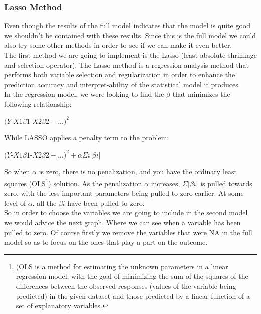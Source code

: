 \documentclass{book}
\begin{document}
\subsubsection{Lasso Method}
Even though the results of the full model indicates that the model is quite good we shouldn't be contained with these results. Since this is the full model we could also try some other methods in order to see if we can make it even better.\\
The first method we are going to implement is the Lasso (least absolute shrinkage and selection operator). The Lasso method is a regression analysis method that performs both variable selection and regularization in order to enhance the prediction accuracy and interpret-ability of the statistical model it produces.\\
In the regression model, we were looking to find the $β$ that minimizes the following relationship:
\begin{center}
$(Y${-}$X1\beta 1${-}$X2\beta 2−...)^{2}$
\end{center}
While LASSO applies a penalty term to the problem:
\begin{center}
$(Y${-}$X1\beta 1${-}$X2\beta 2−...)^{2}+\alpha\Sigma i|\beta i|$
\end{center}
So when $\alpha$ is zero, there is no penalization, and you have the ordinary least squares (OLS\footnote{(OLS is a method for estimating the unknown parameters in a linear regression model, with the goal of minimizing the sum of the squares of the differences between the observed responses (values of the variable being predicted) in the given dataset and those predicted by a linear function of a set of explanatory variables.}) solution. As the penalization $\alpha$ increases, $\Sigma|\beta i|$ is pulled towards zero, with the less important parameters being pulled to zero earlier. At some level of $\alpha$, all the $βi$ have been pulled to zero.\\
So in order to choose the variables we are going to include in the second model we would advice the next graph. Where we can see when a variable has been pulled to zero. Of course firstly we remove the variables that were NA in the full model so as to focus on the ones that play a part on the outcome. 
\end{document}
